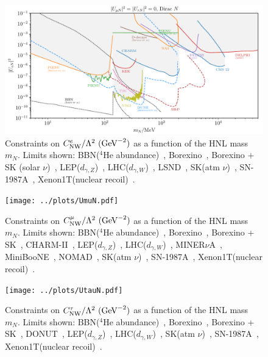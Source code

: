 \documentclass{revtex4-2}%
\begin{document}
%
\normalsize%


\begin{figure}[h!]%
\centering%
\includegraphics[width=1\textwidth]{../plots/UeN.pdf}%
\caption{Constraints on $C_\text{NW}^{e}/\Lambda^2 ~(\rm{GeV}^{-2})$ as a function of the HNL mass $m_N$. Limits shown: BBN($^4$He abundance)~\cite{Brdar:2020quo}, Borexino~\cite{Brdar:2020quo}, Borexino $+$ SK (solar $\nu$)~\cite{Plestid:2020vqf}, LEP($d_{\gamma, Z}$)~\cite{Magill:2018jla}, LHC($d_{\gamma, W}$)~\cite{Magill:2018jla}, LSND~\cite{Magill:2018jla}, SK(atm $\nu$)~\cite{Gustafson:2022rsz}, SN-1987A~\cite{Magill:2018jla}, Xenon1T(nuclear recoil)~\cite{Brdar:2020quo}.}%
\end{figure}

%


\begin{figure}[h!]%
\centering%
\texttt{[image: ../plots/UmuN.pdf]}%
\caption{Constraints on $C_\text{NW}^{\mu}/\Lambda^2 ~(\rm{GeV}^{-2})$ as a function of the HNL mass $m_N$. Limits shown: BBN($^4$He abundance)~\cite{Brdar:2020quo}, Borexino~\cite{Brdar:2020quo}, Borexino + SK~\cite{Plestid:2020vqf}, CHARM-II~\cite{Coloma:2017ppo}, LEP($d_{\gamma, Z}$)~\cite{Magill:2018jla}, LHC($d_{\gamma, W}$)~\cite{Magill:2018jla}, MINER$\nu$A~\cite{Kamp:2022bpt}, MiniBooNE~\cite{Magill:2018jla}, NOMAD~\cite{Gninenko:1998nn}, SK(atm $\nu$)~\cite{Gustafson:2022rsz}, SN-1987A~\cite{Magill:2018jla}, Xenon1T(nuclear recoil)~\cite{Brdar:2020quo}.}%
\end{figure}

%


\begin{figure}[h!]%
\centering%
\texttt{[image: ../plots/UtauN.pdf]}%
\caption{Constraints on $C_\text{NW}^{\tau}/\Lambda^2 ~(\rm{GeV}^{-2})$ as a function of the HNL mass $m_N$. Limits shown: BBN($^4$He abundance)~\cite{Brdar:2020quo}, Borexino~\cite{Brdar:2020quo}, Borexino + SK~\cite{Plestid:2020vqf}, DONUT~\cite{DONUT:2001zvi}, LEP($d_{\gamma, Z}$)~\cite{Magill:2018jla}, LHC($d_{\gamma, W}$)~\cite{Magill:2018jla}, SK(atm $\nu$)~\cite{Gustafson:2022rsz}, SN-1987A~\cite{Magill:2018jla}, Xenon1T(nuclear recoil)~\cite{Brdar:2020quo}.}%
\end{figure}

%
%
%
\end{document}
